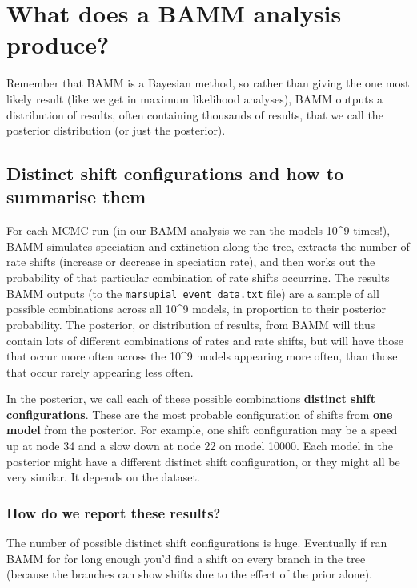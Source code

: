 \documentclass[]{book}
\theoremstyle{definition}
\theoremstyle{definition}
\theoremstyle{definition}
\theoremstyle{remark}
\begin{document}
\section{What does a BAMM analysis
produce?}\label{what-does-a-bamm-analysis-produce}

Remember that BAMM is a Bayesian method, so rather than giving the one
most likely result (like we get in maximum likelihood analyses), BAMM
outputs a distribution of results, often containing thousands of
results, that we call the posterior distribution (or just the
posterior).

\subsection{Distinct shift configurations and how to summarise
them}\label{distinct-shift-configurations-and-how-to-summarise-them}

For each MCMC run (in our BAMM analysis we ran the models 10\^{}9
times!), BAMM simulates speciation and extinction along the tree,
extracts the number of rate shifts (increase or decrease in speciation
rate), and then works out the probability of that particular combination
of rate shifts occurring. The results BAMM outputs (to the
\texttt{marsupial\_event\_data.txt} file) are a sample of all possible
combinations across all 10\^{}9 models, in proportion to their posterior
probability. The posterior, or distribution of results, from BAMM will
thus contain lots of different combinations of rates and rate shifts,
but will have those that occur more often across the 10\^{}9 models
appearing more often, than those that occur rarely appearing less often.

In the posterior, we call each of these possible combinations
\textbf{distinct shift configurations}. These are the most probable
configuration of shifts from \textbf{one model} from the posterior. For
example, one shift configuration may be a speed up at node 34 and a slow
down at node 22 on model 10000. Each model in the posterior might have a
different distinct shift configuration, or they might all be very
similar. It depends on the dataset.

\subsubsection{How do we report these
results?}\label{how-do-we-report-these-results}

The number of possible distinct shift configurations is huge. Eventually
if ran BAMM for for long enough you'd find a shift on every branch in
the tree (because the branches can show shifts due to the effect of the
prior alone).
\end{document}
